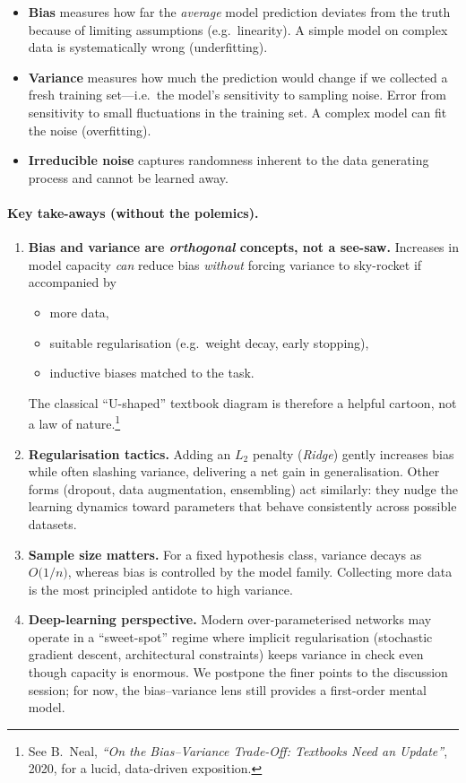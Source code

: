 \documentclass{article}
\begin{document}
\begin{itemize}
\item \textbf{Bias} measures how far the \emph{average} model prediction deviates
      from the truth because of limiting assumptions (e.g.\ linearity). A simple model on complex data is systematically wrong (underfitting).
\item \textbf{Variance} measures how much the prediction would change if we
      collected a fresh training set—i.e.\ the model’s sensitivity to sampling
      noise. Error from sensitivity to small fluctuations in the training set. A complex model can fit the noise (overfitting).
\item \textbf{Irreducible noise} captures randomness inherent to the data
      generating process and cannot be learned away.
\end{itemize}

\paragraph{Key take-aways (without the polemics).}
\begin{enumerate}
\item \textbf{Bias and variance are \emph{orthogonal} concepts, not a see-saw.}  
      Increases in model capacity \emph{can} reduce bias \emph{without} forcing
      variance to sky-rocket if accompanied by
      \begin{itemize}
        \item more data,
        \item suitable regularisation (e.g.\ weight decay, early stopping),
        \item inductive biases matched to the task.
      \end{itemize}
      The classical ``U-shaped'' textbook diagram is therefore a helpful cartoon,
      not a law of nature.\footnote{See B.~Neal, \emph{“On the Bias–Variance
      Trade-Off: Textbooks Need an Update”}, 2020, for a lucid, data-driven
      exposition.}%
\item \textbf{Regularisation tactics.}
      Adding an $L_{2}$ penalty (\emph{Ridge}) gently increases bias while
      often slashing variance, delivering a net gain in generalisation.
      Other forms (dropout, data augmentation, ensembling) act similarly:
      they nudge the learning dynamics toward parameters that behave
      consistently across possible datasets.
\item \textbf{Sample size matters.}
      For a fixed hypothesis class, variance decays as $O\!\bigl(1/n\bigr)$,
      whereas bias is controlled by the model family.  Collecting more data
      is the most principled antidote to high variance.
\item \textbf{Deep-learning perspective.}
      Modern over-parameterised networks may operate in a ``sweet-spot'' regime
      where implicit regularisation (stochastic gradient descent, architectural
      constraints) keeps variance in check even though capacity is enormous.
      We postpone the finer points to the discussion session; for now, the
      bias–variance lens still provides a first-order mental model.
\end{enumerate}
\end{document}
